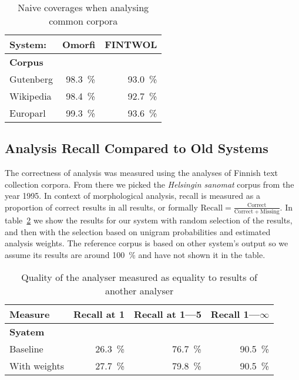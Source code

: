 \documentclass[a4paper,12pt]{article}
\begin{document}
\begin{table}
    \centering
    \begin{tabular}{|l|r|r|}
        \hline
        \bf System: & Omorfi & FINTWOL \\
        \hline
        \bf Corpus & & \\
        \hline
        Gutenberg & 98.3~\% & 93.0~\%   \\
        Wikipedia & 98.4~\% & 92.7~\% \\
        Europarl  & 99.3~\% & 93.6~\% \\
        \hline
    \end{tabular}
    \caption{Naive coverages when analysing common corpora
    \label{table:coverage}}
\end{table}

\subsection{Analysis Recall Compared to Old Systems}

The correctness of analysis was measured using the analyses of Finnish text
collection corpora. From there we picked the \emph{Helsingin sanomat} corpus
from the year 1995. In context of morphological analysis, recall is measured as
a proportion of correct results in all results, or formally $\mathrm{Recall} =
\frac{\mathrm{Correct}}{\mathrm{Correct} + \mathrm{Missing}}$. In 
table~\ref{table:quality} we show the results for our system with random
selection of the results, and then with the selection based on unigram 
probabilities and estimated analysis weights. The reference corpus is based on
other system's output so we assume its results are around 100~\% and have not
shown it in the table.

\begin{table}
    \centering
    \begin{tabular}{|l|r|r|r|}
        \hline
        \bf Measure & Recall at 1 & Recall at 1---5 & Recall 1---$\infty$  \\
        \hline
        \bf Syatem & & & \\
        \hline
        Baseline & 26.3~\% & 76.7~\% & 90.5~\%\\
        With weights & 27.7~\% & 79.8~\% & 90.5~\%\\
        \hline
    \end{tabular}
    \caption{Quality of the analyser measured as equality to results of
        another analyser \label{table:quality}}
\end{table}
\end{document}
